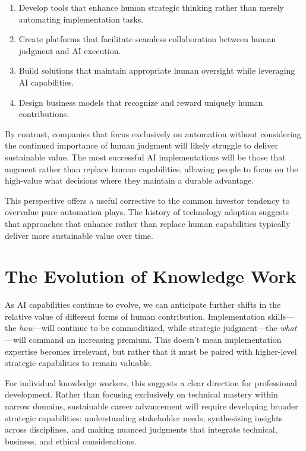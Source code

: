 \documentclass[
  Letterpaper,
]{scrbook}
\providecommand{\tightlist}{%
  \setlength{\itemsep}{0pt}\setlength{\parskip}{0pt}}\usepackage{longtable,booktabs,array}
\begin{document}
\begin{enumerate}
\def\labelenumi{\arabic{enumi}.}
\tightlist
\item
  Develop tools that enhance human strategic thinking rather than merely
  automating implementation tasks.
\item
  Create platforms that facilitate seamless collaboration between human
  judgment and AI execution.
\item
  Build solutions that maintain appropriate human oversight while
  leveraging AI capabilities.
\item
  Design business models that recognize and reward uniquely human
  contributions.
\end{enumerate}

By contrast, companies that focus exclusively on automation without
considering the continued importance of human judgment will likely
struggle to deliver sustainable value. The most successful AI
implementations will be those that augment rather than replace human
capabilities, allowing people to focus on the high-value what decisions
where they maintain a durable advantage.

This perspective offers a useful corrective to the common investor
tendency to overvalue pure automation plays. The history of technology
adoption suggests that approaches that enhance rather than replace human
capabilities typically deliver more sustainable value over time.

\section{The Evolution of Knowledge
Work}\label{the-evolution-of-knowledge-work}

As AI capabilities continue to evolve, we can anticipate further shifts
in the relative value of different forms of human contribution.
Implementation skills---the \emph{how}---will continue to be
commoditized, while strategic judgment---the \emph{what}---will command
an increasing premium. This doesn't mean implementation expertise
becomes irrelevant, but rather that it must be paired with higher-level
strategic capabilities to remain valuable.

For individual knowledge workers, this suggests a clear direction for
professional development. Rather than focusing exclusively on technical
mastery within narrow domains, sustainable career advancement will
require developing broader strategic capabilities: understanding
stakeholder needs, synthesizing insights across disciplines, and making
nuanced judgments that integrate technical, business, and ethical
considerations.
\end{document}
